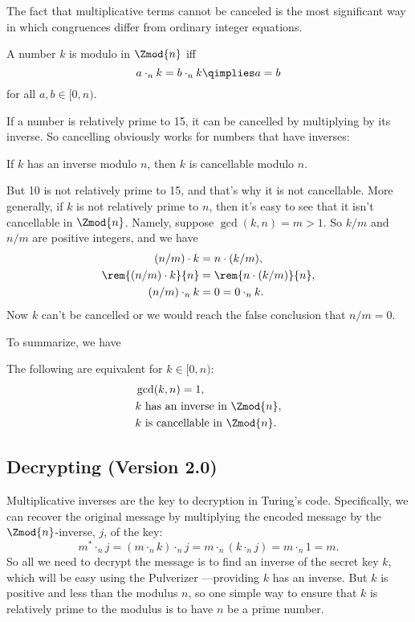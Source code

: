 The fact that multiplicative terms cannot be canceled is the most
significant way in which congruences differ from ordinary integer
equations.

\begin{definition}
A number $k$ is  modulo in $\Zmod{n}$ iff
\[
a \cdot_n k = b \cdot_n k  \qimplies a = b
\]
for all $a,b \in [0,n)$.
\end{definition}

If a number is relatively prime to 15, it can be cancelled by
multiplying by its inverse.  So cancelling obviously works for numbers
that have inverses:

\begin{lemma}\label{lem:cancellation-arb}
If $k$ has an inverse modulo $n$, then $k$ is cancellable modulo $n$.
\end{lemma}

But 10 is not relatively prime to 15, and that's why it is not
cancellable.  More generally, if $k$ is not relatively prime to $n$,
then it's easy to see that it isn't cancellable in $\Zmod{n}$.
Namely, suppose $\gcd(k,n) = m > 1$.  So $k/m$ and $n/m$ are
positive integers, and we have
\begin{align*}
          (n/m) \cdot k & = n \cdot (k/m),\\
\rem{(n/m) \cdot k}{n} & = \rem{n \cdot (k/m)}{n},\\
        (n/m) \cdot_n k & = 0 = 0 \cdot_n k.
\end{align*}
Now $k$ can't be cancelled or we would reach the false conclusion that
$n/m = 0$.

To summarize, we have
\begin{theorem}\label{thm:mod_inverses}
The following are equivalent for $k \in [0,n)$:
\begin{align*}
& \gcd(k, n) = 1,\\
& k \text{ has an inverse in $\Zmod{n}$},\\
& k \text{ is cancellable in $\Zmod{n}$}.
\end{align*}
\end{theorem}

\subsection{Decrypting (Version 2.0)}

Multiplicative inverses are the key to decryption in Turing's code.
Specifically, we can recover the original message by multiplying the
encoded message by the $\Zmod{n}$-inverse, $j$, of the key:
\[
m^* \cdot_n j = (m \cdot_n k) \cdot_n j = m \cdot_n (k \cdot_n j) = m \cdot_n 1 = m.
\]
So all we need to decrypt the message is to find an inverse of the
secret key $k$, which will be easy using the Pulverizer ---providing
$k$ has an inverse.  But $k$ is positive and less than the modulus
$n$, so one simple way to ensure that $k$ is relatively prime to the
modulus is to have $n$ be a prime number.

